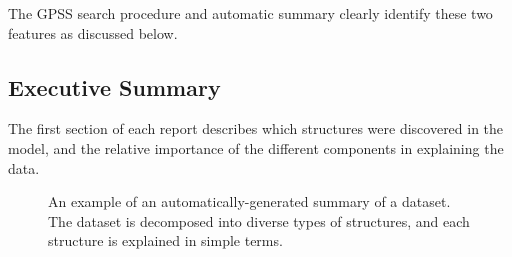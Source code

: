\documentclass{article} %
\begin{document}
The GPSS search procedure and automatic summary clearly identify these two features as discussed below.

\subsection{Executive Summary}

The first section of each report describes which structures were discovered in the model, and the relative importance of the different components in explaining the data.

\begin{figure}[h]
\centering
{}
\caption{
An example of an automatically-generated summary of a dataset.  The dataset is decomposed into diverse types of structures, and each structure is explained in simple terms.}
\label{fig:exec}
\end{figure}
\end{document}
